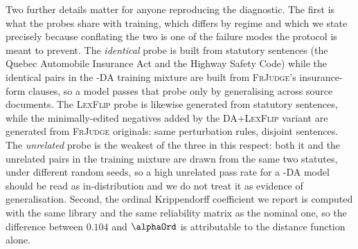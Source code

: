 \documentclass[11pt]{article}
\begin{document}
Two further details matter for anyone reproducing the diagnostic. The first is
what the probes share with training, which differs by regime and which we state
precisely because conflating the two is one of the failure modes the protocol is
meant to prevent. The \emph{identical} probe is built from statutory sentences
(the Quebec Automobile Insurance Act and the Highway Safety Code) while the
identical pairs in the \textsc{-DA} training mixture are built from
\textsc{FrJudge}'s insurance-form clauses, so a model passes that probe only by
generalising across source documents. The \textsc{LexFlip} probe is likewise
generated from statutory sentences, while the minimally-edited negatives added
by the \textsc{DA+LexFlip} variant are generated from \textsc{FrJudge}
originals: same perturbation rules, disjoint sentences. The \emph{unrelated}
probe is the weakest of the three in this respect: both it and the unrelated
pairs in the training mixture are drawn from the same two statutes, under
different random seeds, so a high unrelated pass rate for a \textsc{-DA} model
should be read as in-distribution and we do not treat it as evidence of
generalisation. Second, the ordinal Krippendorff coefficient we report is
computed with the same library and the same reliability matrix as the nominal
one, so the difference between $0.104$ and $\alphaOrd$ is attributable to the
distance function alone.



\end{document}
